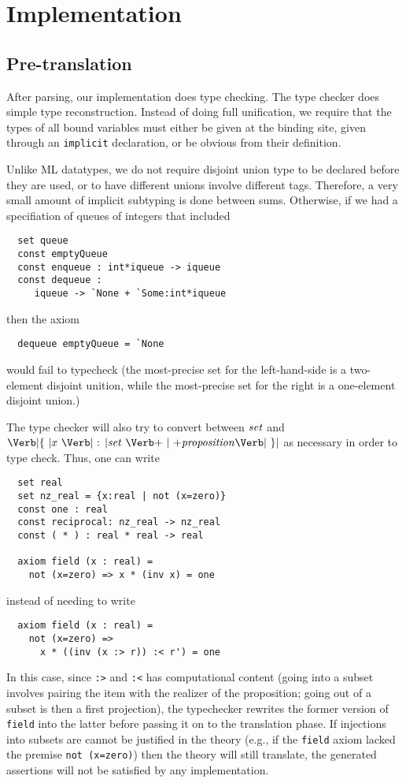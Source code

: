 
\section{Implementation}
\label{sec:implementation}

\subsection{Pre-translation}

After parsing, our implementation does type checking.  The type
checker does simple type reconstruction.  Instead of doing full
unification, we require that the types of all bound variables must
either be given at the binding site, given through an \Verb|implicit|
declaration, or be obvious from their definition.  

Unlike ML datatypes, we do not require disjoint union type
to be declared before they are used, or to have different unions
involve different tags.  Therefore, a very small amount of implicit 
subtyping is done between sums.  Otherwise, if we had a
specifiation of queues of integers that included
\begin{Verbatim}
  set queue
  const emptyQueue
  const enqueue : int*iqueue -> iqueue
  const dequeue : 
     iqueue -> `None + `Some:int*iqueue
\end{Verbatim}
then the axiom
\begin{Verbatim}
  dequeue emptyQueue = `None
\end{Verbatim}
would fail to typecheck (the most-precise set for the left-hand-side
is a two-element disjoint unition, while the most-precise set
for the right is a one-element disjoint union.)

The type checker will also try to convert between $\mbox{\textit{set}}$ and $\LBRACE
x \ \COLON \Setexp\ \BAR \Proposition \RBRACE$ as necessary in order
to type check.  Thus, one can write
\begin{Verbatim}
  set real
  set nz_real = {x:real | not (x=zero)}
  const one : real
  const reciprocal: nz_real -> nz_real
  const ( * ) : real * real -> real

  axiom field (x : real) =
    not (x=zero) => x * (inv x) = one
\end{Verbatim}
instead of needing to write
\begin{Verbatim}
  axiom field (x : real) =
    not (x=zero) => 
      x * ((inv (x :> r)) :< r') = one
\end{Verbatim}
In this case, since \Verb|:>| and \Verb|:<| has computational content
(going into a subset involves pairing the item with the realizer of
the proposition; going out of a subset is then a first projection),
the typechecker rewrites the former version of \Verb|field| into the
latter before passing it on to the translation phase.  If injections
into subsets are cannot be justified in the theory (e.g., if the
\Verb|field| axiom lacked the premise \Verb|not (x=zero)|) then the
theory will still translate, the generated assertions will not be
satisfied by any implementation.

